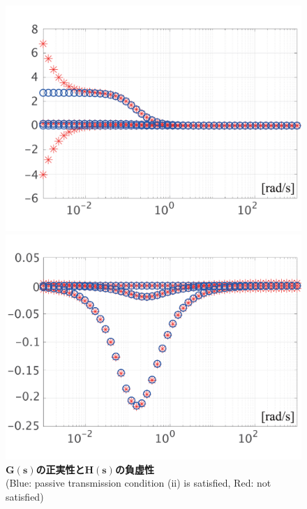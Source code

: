 \documentclass[tombow,dvipdfmx]{corona-a5-1.1}
\begin{document}
\begin{figure}[t]
  \centering
  {
  \begin{minipage}{0.49\linewidth}
    \centering
    \includegraphics[width = 1.0\linewidth]{figs/eigG}
    \medskip
  \end{minipage}
  \begin{minipage}{0.49\linewidth}
    \centering
    \includegraphics[width = 1.0\linewidth]{figs/eigH}
    \medskip
  \end{minipage}
  }
  \medskip
  \caption{\textbf{$\bm{G(s)}$の正実性と$\bm{H(s)}$の負虚性}
  \\  \centering(Blue: passive transmission condition (ii) is satisfied, Red: not satisfied)}
  \label{fig:eigGH}
\medskip
\end{figure}
\end{document}
